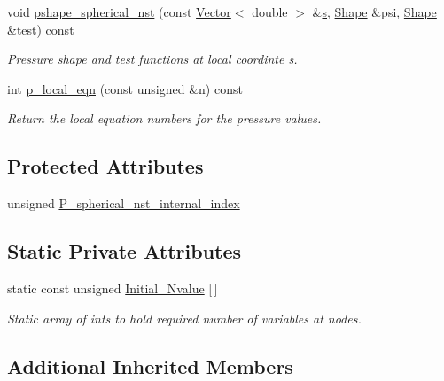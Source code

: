 \begin{DoxyCompactItemize}
void \hyperlink{classoomph_1_1QSphericalCrouzeixRaviartElement_a25604ebbfd2720a969f2c3b6670d0d9c}{pshape\+\_\+spherical\+\_\+nst} (const \hyperlink{classoomph_1_1Vector}{Vector}$<$ double $>$ \&\hyperlink{cfortran_8h_ab7123126e4885ef647dd9c6e3807a21c}{s}, \hyperlink{classoomph_1_1Shape}{Shape} \&psi, \hyperlink{classoomph_1_1Shape}{Shape} \&test) const
\begin{DoxyCompactList}\small\item\em Pressure shape and test functions at local coordinte s. \end{DoxyCompactList}\item 
int \hyperlink{classoomph_1_1QSphericalCrouzeixRaviartElement_a5a4508bfabe7a630fd6c685ccc59870b}{p\+\_\+local\+\_\+eqn} (const unsigned \&n) const
\begin{DoxyCompactList}\small\item\em Return the local equation numbers for the pressure values. \end{DoxyCompactList}\end{DoxyCompactItemize}
\subsection*{Protected Attributes}
\begin{DoxyCompactItemize}
\item 
unsigned \hyperlink{classoomph_1_1QSphericalCrouzeixRaviartElement_afe49582c1bb7d3b8adb0593baf75f228}{P\+\_\+spherical\+\_\+nst\+\_\+internal\+\_\+index}
\end{DoxyCompactItemize}
\subsection*{Static Private Attributes}
\begin{DoxyCompactItemize}
\item 
static const unsigned \hyperlink{classoomph_1_1QSphericalCrouzeixRaviartElement_acdacde8819e9cf5655c61ae9ed91a146}{Initial\+\_\+\+Nvalue} \mbox{[}$\,$\mbox{]}
\begin{DoxyCompactList}\small\item\em Static array of ints to hold required number of variables at nodes. \end{DoxyCompactList}\end{DoxyCompactItemize}
\subsection*{Additional Inherited Members}


